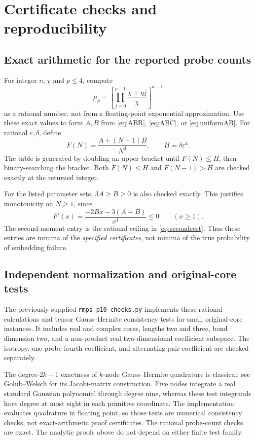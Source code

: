 \documentclass[11pt]{article}
\numberwithin{equation}{section}
\theoremstyle{definition}\newtheorem{definition}[theorem]{Definition}
\theoremstyle{remark}\newtheorem{remark}[theorem]{Remark}
\begin{document}
\clearpage
\appendix

\section{Certificate checks and reproducibility}\label{app:checks}
\subsection{Exact arithmetic for the reported probe counts}
For integer $n,\chi$ and $p\le4$, compute
\[
 \mu_p=\left[\prod_{j=0}^{p-1}\frac{\chi+\eta j}{\chi}\right]^{n-1}
\]
as a rational number, not from a floating-point exponential approximation.
Use these exact values to form $A,B$ from \eqref{eq:ABR}, \eqref{eq:ABC}, or
\eqref{eq:uniformAB}. For rational $\varepsilon,\delta$, define
\[
 F(N)=\frac{A+(N-1)B}{N^3},\qquad H=\delta\varepsilon^4.
\]
The table is generated by doubling an upper bracket until $F(N)\le H$, then
binary-searching the bracket. Both $F(N)\le H$ and $F(N-1)>H$ are checked
exactly at the returned integer.

For the listed parameter sets, $3A\ge B\ge0$ is also checked exactly. This
justifies monotonicity on $N\ge1$, since
\[
 F'(x)=\frac{-2Bx-3(A-B)}{x^4}\le0\qquad(x\ge1).
\]
The second-moment entry is the rational ceiling in \eqref{eq:secondcert}.
Thus these entries are minima of the \emph{specified certificates}, not minima
of the true probability of embedding failure.

\subsection{Independent normalization and original-core tests}
The previously supplied \texttt{rmps\_p10\_checks.py} implements these rational
calculations and tensor Gauss--Hermite consistency tests for small original-core
instances. It includes real and complex cores, lengths two and three, bond
dimension two, and a non-product real two-dimensional coefficient subspace.
The isotropy, one-probe fourth coefficient, and alternating-pair coefficient
are checked separately.

The degree-$2k-1$ exactness of $k$-node Gauss--Hermite quadrature is classical;
see Golub--Welsch \cite{GolubWelsch} for its Jacobi-matrix construction.
Five nodes integrate a real standard Gaussian polynomial through degree nine,
whereas these test integrands have degree at most eight in each primitive
coordinate. The implementation evaluates quadrature in floating point,
so those tests are numerical consistency checks, not exact-arithmetic proof
certificates. The rational probe-count checks are exact. The analytic proofs
above do not depend on either finite test family.
\end{document}
